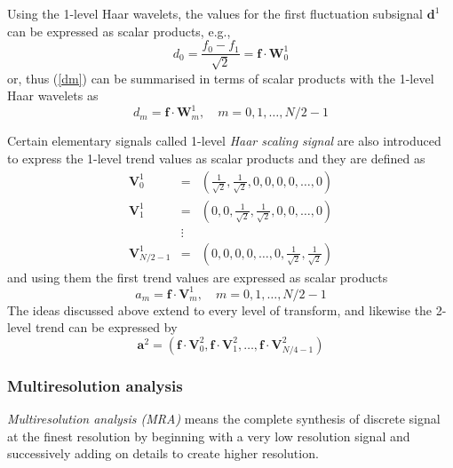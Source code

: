 \documentclass[a4paper,11pt]{report}
\begin{document}
Using the 1-level Haar wavelets, the values for the first fluctuation subsignal $\mathbf{d}^{1}$ can be expressed as scalar products, e.g.,
\begin{displaymath}
d_{0}=\frac{f_{0}-f_{1}}{\sqrt{2}}=\mathbf{f} \cdot \mathbf{W}_{0}^{1}
\end{displaymath}
or, thus (\ref{dm}) can be summarised in terms of scalar products with the 1-level Haar wavelets as
\begin{equation} \label{dm2}
d_{m} = \mathbf{f} \cdot \mathbf{W}_{m}^{1}, \quad m=0,1,\ldots,N/2-1
\end{equation}

Certain elementary signals called 1-level \emph{Haar scaling signal} are also introduced to express the 1-level trend values as scalar products and they are defined as
\begin{eqnarray}
\mathbf{V}_{0}^{1} & = &\left( \frac{1}{\sqrt{2}},\frac{1}{\sqrt{2}},0,0,0,0,\ldots,0 \right) \nonumber \\
\mathbf{V}_{1}^{1} & = & \left( 0,0,\frac{1}{\sqrt{2}},\frac{1}{\sqrt{2}},0,0,\ldots,0 \right) \nonumber \\
	 & \vdots & 	\nonumber \\
\mathbf{V}_{N/2-1}^{1} & = & \left( 0,0,0,0,\ldots,0,\frac{1}{\sqrt{2}},\frac{1}{\sqrt{2}} \right) 
\end{eqnarray}
and using them the first trend values are expressed as scalar products
\begin{equation} \label{am2}
a_{m} = \mathbf{f} \cdot \mathbf{V}_{m}^{1}, \quad m=0,1,\ldots,N/2-1
\end{equation}
The ideas discussed above extend to every level of transform, and likewise the 2-level trend can be expressed by
\begin{displaymath}
\mathbf{a}^{2} = \left( \mathbf{f}\cdot\mathbf{V}_{0}^{2},\mathbf{f}\cdot\mathbf{V}_{1}^{2},\ldots,\mathbf{f}\cdot\mathbf{V}_{N/4-1}^{2} \right)
\end{displaymath}

\subsubsection{Multiresolution analysis}
\emph{Multiresolution analysis (MRA)} means the complete synthesis of discrete signal at the finest resolution by beginning with a very low resolution signal and successively adding on details to create higher resolution. \cite{walker}
\end{document}
